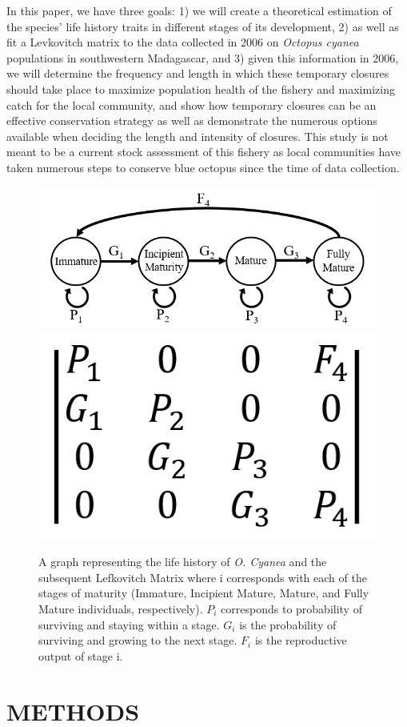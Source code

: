 \documentclass[
]{article}
\begin{document}
In this paper, we have three goals: 1) we will create a theoretical estimation of the species' life history traits in different stages of its development, 2) as well as fit a Levkovitch matrix to the data collected in 2006 on \emph{Octopus cyanea} populations in southwestern Madagascar, and 3) given this information in 2006, we will determine the frequency and length in which these temporary closures should take place to maximize population health of the fishery and maximizing catch for the local community, and show how temporary closures can be an effective conservation strategy as well as demonstrate the numerous options available when deciding the length and intensity of closures. This study is not meant to be a current stock assessment of this fishery as local communities have taken numerous steps to conserve blue octopus since the time of data collection.



\begin{figure}
\includegraphics[width=0.45\linewidth]{LifeGraph} \includegraphics[width=0.45\linewidth]{MtxGeneric} \caption{A graph representing the life history of \emph{O. Cyanea} and the subsequent Lefkovitch Matrix where i corresponds with each of the stages of maturity (Immature, Incipient Mature, Mature, and Fully Mature individuals, respectively). \(P_i\) corresponds to probability of surviving and staying within a stage. \(G_i\) is the probability of surviving and growing to the next stage. \(F_i\) is the reproductive output of stage i. \label{LifeGraph}}\label{fig:LifeGraph}
\end{figure}

\hypertarget{methods}{%
\section{METHODS}\label{methods}}
\end{document}
